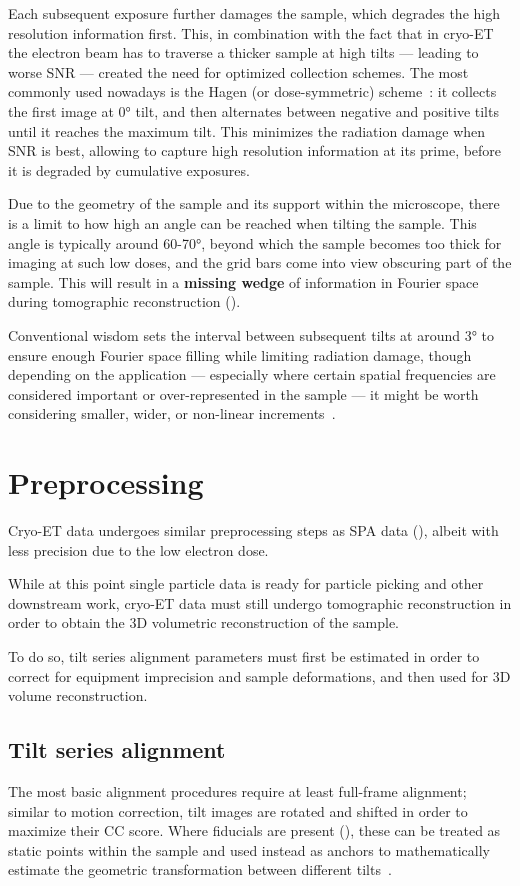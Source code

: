Each subsequent exposure further damages the sample, which degrades the high resolution information first.
This, in combination with the fact that in cryo-ET the electron beam has to traverse a thicker sample at high tilts --- leading to worse SNR --- created the need for optimized collection schemes.
The most commonly used nowadays is the Hagen (or dose-symmetric)  scheme~\cite{hagenImplementationCryoelectronTomography2017}: it collects the first image at 0° tilt, and then alternates between negative and positive tilts until it reaches the maximum tilt.
This minimizes the radiation damage when SNR is best, allowing to capture high resolution information at its prime, before it is degraded by cumulative exposures.

Due to the geometry of the sample and its support within the microscope, there is a limit to how high an angle can be reached when tilting the sample.
This angle is typically around 60-70°, beyond which the sample becomes too thick for imaging at such low doses, and the grid bars come into view obscuring part of the sample.
This will result in a \textbf{missing wedge} of information in Fourier space during tomographic reconstruction ().

Conventional wisdom sets the interval between subsequent tilts at around 3° to ensure enough Fourier space filling while limiting radiation damage, though depending on the application --- especially where certain spatial frequencies are considered important or over-represented in the sample --- it might be worth considering smaller, wider, or non-linear increments~\cite{copeCryoElectronTomographyStructural2011}.

\section{Preprocessing}
Cryo-ET data undergoes similar preprocessing steps as SPA data (), albeit with less precision due to the low electron dose.

While at this point single particle data is ready for particle picking and other downstream work, cryo-ET data must still undergo tomographic reconstruction in order to obtain the 3D volumetric reconstruction of the sample.

To do so, tilt series alignment parameters must first be estimated in order to correct for equipment imprecision and sample deformations, and then used for 3D volume reconstruction.

\subsection{Tilt series alignment}\label{et_tilt_series_alignment}
The most basic alignment procedures require at least full-frame alignment; similar to motion correction, tilt images are rotated and shifted in order to maximize their CC score.
Where fiducials are present (), these can be treated as static points within the sample and used instead as anchors to mathematically estimate the geometric transformation between different tilts~\cite{nicastroMolecularArchitectureAxonemes2006,heumannClusteringVarianceMaps2011,castano-diezDynamoCatalogueGeometrical2017}.

